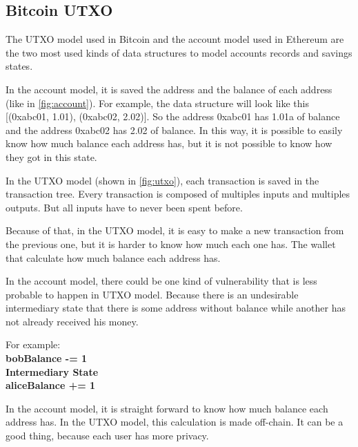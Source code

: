 \subsection{Bitcoin UTXO}

The UTXO model used in Bitcoin and the account model used in Ethereum are the two most used kinds
of data structures to model accounts records and savings states.


In the account model, it is saved the address and the balance of each address
(like in \ref{fig:account}).
For example, the data structure will look like this [(0xabc01, 1.01), (0xabc02, 2.02)].
So the address 0xabc01 has 1.01a of balance and the address 0xabc02 has 2.02 of balance.
In this way, it is possible to easily know how much balance each address has,
but it is not possible to know how they got in this state.


In the UTXO model (shown in \ref{fig:utxo}), each transaction is saved in the transaction tree.
Every transaction is composed of multiples inputs and multiples outputs.
But all inputs have to never been spent before.

Because of that, in the UTXO model, it is easy to make a new transaction from the previous one,
but it is harder to know how much each one has.
The wallet that calculate how much balance each address has.

In the account model, there could be one kind of vulnerability that is less probable to happen in UTXO
model.
Because there is an undesirable intermediary state that there is some address without balance while
another has not already received his money.

For example: \\
\textbf{
bobBalance -= 1 \\
Intermediary State \\
aliceBalance += 1
}

In the account model, it is straight forward to know how much balance each address has.
In the UTXO model, this calculation is made off-chain. It can be a good thing,
because each user has more privacy.
